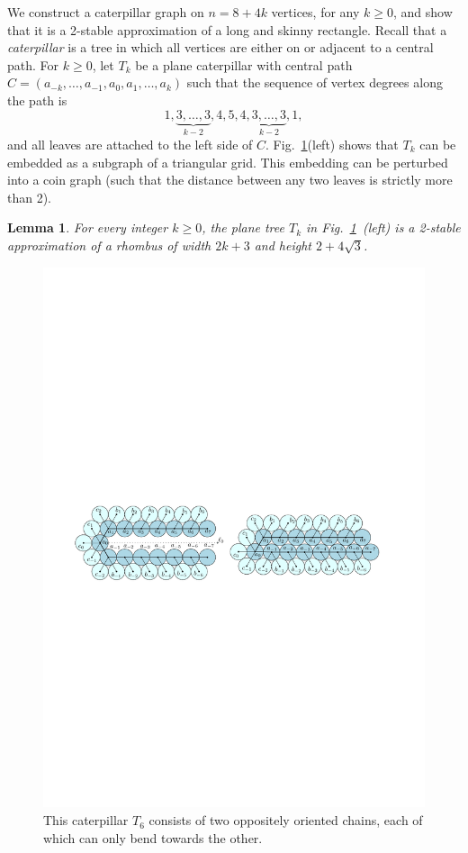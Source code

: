 \documentclass{article}
\theoremstyle{plain}%
\newtheorem{lemma}{Lemma}
\begin{document}
We construct a caterpillar graph on $n=8+4k$ vertices, for any $k \geq 0$,
and show that it is a 2-stable approximation of a long and skinny rectangle.
Recall that a \emph{caterpillar} is a tree in which all vertices are either on
or adjacent to a central path. For $k\geq 0$, let $T_k$ be a plane caterpillar
with central path $C=(a_{-k},\ldots, a_{-1},a_0,a_1,\ldots ,a_k)$ such that the
sequence of vertex degrees along the path is
\begin{equation}
1, \underbrace{3, \ldots, 3}_{k-2}, 4, 5, 4,
\underbrace{3, \ldots, 3}_{k-2}, 1 ,
\label{eq:caterpillarDegrees}
\end{equation}
and all leaves are attached to the left side of $C$.
Fig.~\ref{fig:tree}(left) shows that $T_k$ can be embedded as a subgraph
of a triangular grid. This embedding can be perturbed into a coin graph
(such that the distance between any two leaves is strictly more than 2).

\begin{lemma}\label{lem:stableTree}
For every integer $k\geq 0$, the plane tree $T_k$ in Fig.~\ref{fig:tree}~(left)
is a 2-stable approximation of a rhombus of width $2k+3$ and height $2+4\sqrt{3}$.
\end{lemma}

\begin{figure}
\centering
\includegraphics[width=.8\textwidth]{fig-ushape}
\caption{This caterpillar $T_6$ consists of two oppositely oriented chains,
each of which can only bend towards the other.}
\label{fig:tree}
\end{figure}
\end{document}
